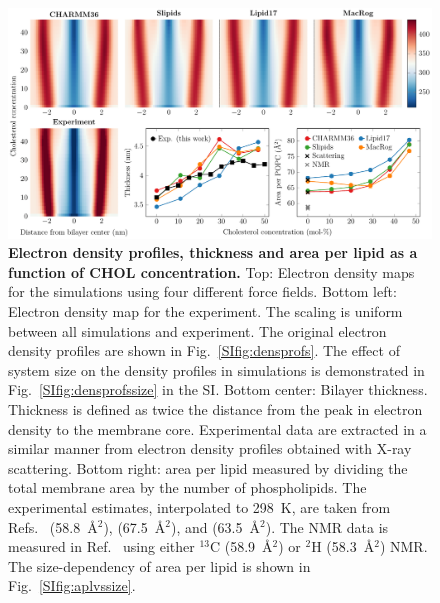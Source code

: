\documentclass[journal=jctcce]{achemso}
\begin{document}
\begin{figure}[htb!]
  \centering
  \includegraphics[width=\linewidth]{../FIGS/densitymaps.pdf}
  \caption{\label{fig:densmaps}%
  \textbf{Electron density profiles, thickness and area per lipid as a function of CHOL concentration.}
  Top: Electron density maps for the simulations using four different force fields.
  Bottom left: Electron density map for the experiment. The scaling is uniform between all simulations and experiment. The original electron density profiles are shown in Fig.~\ref{SIfig:densprofs}. The effect of system size on the density profiles in simulations is demonstrated in Fig.~\ref{SIfig:densprofssize} in the SI.
  Bottom center: Bilayer thickness. Thickness is defined as twice the distance from the peak in electron density to the membrane core. Experimental data are extracted in a similar manner from electron density profiles obtained with X-ray scattering.
  Bottom right: area per lipid measured by dividing the total membrane area by the number of phospholipids. The experimental estimates, interpolated to 298~K, are taken from Refs.~ (58.8~\AA{}$^2$),  (67.5~\AA{}$^2$), and  (63.5~\AA{}$^2$). The NMR data is measured in Ref.~ using either $^{13}$C (58.9~\AA{}$^2$) or $^2$H (58.3~\AA{}$^2$) NMR.
  The size-dependency of area per lipid is shown in Fig.~\ref{SIfig:aplvssize}.
  }
\end{figure}
\end{document}
